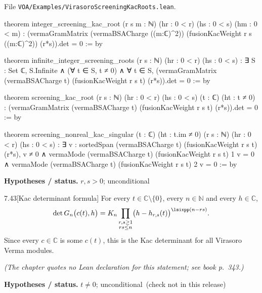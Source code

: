 \documentclass[11pt,openany]{book}
\newcommand{\leanpath}[1]{\texttt{\small #1}}
\theoremstyle{definition}
\theoremstyle{plain}
\newcommand{\C}{{\mathbb{C}}}
\newcommand{\N}{{\mathbb{N}}}
\begin{document}
{\raggedright\noindent File \leanpath{VOA/\allowbreak Examples/\allowbreak VirasoroScreeningKacRoots.lean}.\par}
\begin{leancode}
theorem integer_screening_kac_root (r s m : ℕ) (hr : 0 < r) (hs : 0 < s)
    (hm : 0 < m) :
    (vermaGramMatrix (vermaBSACharge ((m:ℂ)^2))
      (fusionKacWeight r s ((m:ℂ)^2)) (r*s)).det = 0 := by

theorem infinite_integer_screening_roots (r s : ℕ) (hr : 0 < r) (hs : 0 < s) :
    ∃ S : Set ℂ, S.Infinite ∧ (∀ t ∈ S, t ≠ 0) ∧
      ∀ t ∈ S, (vermaGramMatrix (vermaBSACharge t)
        (fusionKacWeight r s t) (r*s)).det = 0 := by

theorem screening_kac_root (r s : ℕ) (hr : 0 < r) (hs : 0 < s)
    (t : ℂ) (ht : t ≠ 0) :
    (vermaGramMatrix (vermaBSACharge t) (fusionKacWeight r s t) (r*s)).det = 0 := by

theorem screening_nonreal_kac_singular (t : ℂ) (ht : t.im ≠ 0)
    (r s : ℕ) (hr : 0 < r) (hs : 0 < s) :
    ∃ v : sortedSpan (vermaBSACharge t) (fusionKacWeight r s t) (r*s),
      v ≠ 0 ∧ vermaMode (vermaBSACharge t) (fusionKacWeight r s t) 1 v = 0 ∧
        vermaMode (vermaBSACharge t) (fusionKacWeight r s t) 2 v = 0 := by
\end{leancode}
\noindent\textbf{Hypotheses / status.} $r,s>0$; unconditional\par
\medskip
\begin{btheorem}{7.43}[Kac determinant formula]
For every $t\in\C\setminus\{0\}$, every $n\in\N$ and every $h\in\C$,
\begin{equation*}
 \det G_n\bigl(c(t),h\bigr) = K_n\prod_{\substack{r,s\ge1\\ rs\le n}}\bigl(h-h_{r,s}(t)\bigr)^{\lsixpp(n-rs)} .
\end{equation*}
Since every $c\in\C$ is some $c(t)$, this is the Kac determinant for all Virasoro Verma modules.
\end{btheorem}
\noindent\emph{(The chapter quotes no Lean declaration for this statement; see book p.~343.)}\par
\noindent\textbf{Hypotheses / status.} $t\ne0$; unconditional\ (check not in this release)\par
\medskip
\endgroup
\setcounter{chapter}{7}
\end{document}
